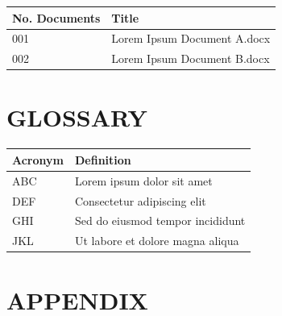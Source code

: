 \documentclass[12pt,a4paper]{article}
\begin{document}
\begin{longtable}{|p{3cm}|p{10cm}|}
\hline
\textbf{No. Documents} & \textbf{Title} \\
\hline
001 & Lorem Ipsum Document A.docx \\
\hline
002 & Lorem Ipsum Document B.docx \\
\hline
\end{longtable}

\vspace{1cm}

\section{GLOSSARY}

\begin{longtable}{|p{3cm}|p{10cm}|}
\hline
\textbf{Acronym} & \textbf{Definition} \\
\hline
ABC & Lorem ipsum dolor sit amet \\
\hline
DEF & Consectetur adipiscing elit \\
\hline
GHI & Sed do eiusmod tempor incididunt \\
\hline
JKL & Ut labore et dolore magna aliqua \\
\hline
\end{longtable}

\newpage

\section*{APPENDIX}
\end{document}
